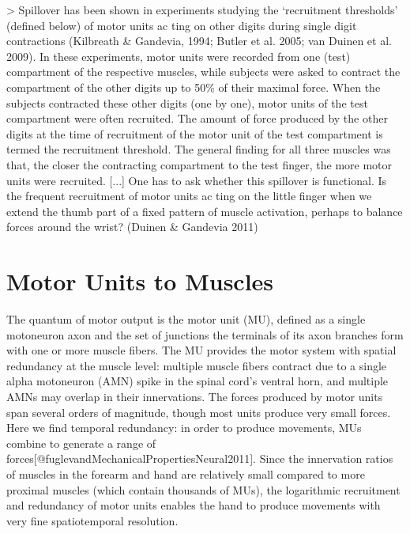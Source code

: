 \documentclass[../main.tex]{subfiles}
\begin{document}
> Spillover has been shown in experiments studying the ‘recruitment thresholds’ (defined below) of motor units ac ting on other digits during single digit contractions (Kilbreath & Gandevia, 1994; Butler et al. 2005; van Duinen et al. 2009). In these experiments, motor units were recorded from one (test) compartment of the respective muscles, while subjects were asked to contract the compartment of the other digits up to 50\% of their maximal force. When the subjects contracted these other digits (one by one), motor units of the test compartment were often recruited. The amount of force produced by the other digits at the time of recruitment of the motor unit of the test compartment is termed the recruitment threshold. The general finding for all three muscles was that, the closer the contracting compartment to the test finger, the more motor units were recruited. [...] One has to ask whether this spillover is functional. Is the frequent recruitment of motor units ac ting on the little finger when we extend the thumb part of a fixed pattern of muscle activation, perhaps to balance forces around the wrist? (Duinen & Gandevia 2011) 

























\section{Motor Units to Muscles}\label{motor-units-to-muscles}

The quantum of motor output is the motor unit (MU), defined as a single motoneuron axon and the set of junctions the terminals of its axon branches form with one or more muscle fibers. The MU provides the motor system with spatial redundancy at the muscle level: multiple muscle fibers contract due to a single alpha motoneuron (AMN) spike in the spinal cord's ventral horn, and multiple AMNs may overlap in their innervations. The forces produced by motor units span several orders of magnitude, though most units produce very small forces. Here we find temporal redundancy: in order to produce movements, MUs combine to generate a range of forces{[}@fuglevandMechanicalPropertiesNeural2011{]}. Since the innervation ratios of muscles in the forearm and hand are relatively small compared to more proximal muscles (which contain thousands of MUs), the logarithmic recruitment and redundancy of motor units enables the hand to produce movements with very fine spatiotemporal resolution.
\end{document}
